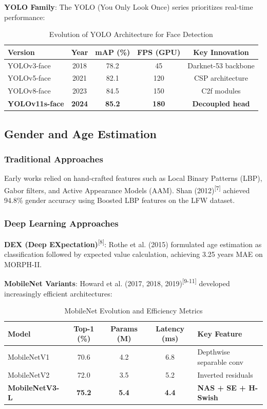 \documentclass[12pt,a4paper]{article}
\begin{document}
\textbf{YOLO Family}: The YOLO (You Only Look Once) series prioritizes real-time performance:

\begin{table}[H]
\centering
\caption{Evolution of YOLO Architecture for Face Detection}
\begin{tabular}{lcccc}
\toprule
\textbf{Version} & \textbf{Year} & \textbf{mAP (\%)} & \textbf{FPS (GPU)} & \textbf{Key Innovation} \\
\midrule
YOLOv3-face & 2018 & 78.2 & 45 & Darknet-53 backbone \\
YOLOv5-face & 2021 & 82.1 & 120 & CSP architecture \\
YOLOv8-face & 2023 & 84.5 & 150 & C2f modules \\
\textbf{YOLOv11s-face} & \textbf{2024} & \textbf{85.2} & \textbf{180} & \textbf{Decoupled head} \\
\bottomrule
\end{tabular}
\end{table}

\subsection{Gender and Age Estimation}

\subsubsection{Traditional Approaches}

Early works relied on hand-crafted features such as Local Binary Patterns (LBP), Gabor filters, and Active Appearance Models (AAM). Shan (2012)\textsuperscript{[7]} achieved 94.8\% gender accuracy using Boosted LBP features on the LFW dataset.

\subsubsection{Deep Learning Approaches}

\textbf{DEX (Deep EXpectation)}\textsuperscript{[8]}: Rothe et al. (2015) formulated age estimation as classification followed by expected value calculation, achieving 3.25 years MAE on MORPH-II.

\textbf{MobileNet Variants}: Howard et al. (2017, 2018, 2019)\textsuperscript{[9-11]} developed increasingly efficient architectures:

\begin{table}[H]
\centering
\caption{MobileNet Evolution and Efficiency Metrics}
\begin{tabular}{lcccl}
\toprule
\textbf{Model} & \textbf{Top-1 (\%)} & \textbf{Params (M)} & \textbf{Latency (ms)} & \textbf{Key Feature} \\
\midrule
MobileNetV1 & 70.6 & 4.2 & 6.8 & Depthwise separable conv \\
MobileNetV2 & 72.0 & 3.5 & 5.2 & Inverted residuals \\
\textbf{MobileNetV3-L} & \textbf{75.2} & \textbf{5.4} & \textbf{4.4} & \textbf{NAS + SE + H-Swish} \\
\bottomrule
\end{tabular}
\end{table}
\end{document}
